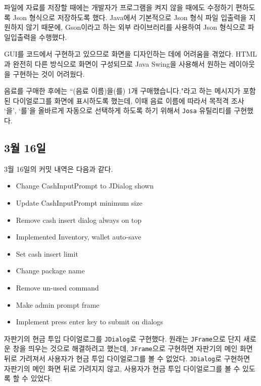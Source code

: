 \documentclass{oblivoir}
\begin{document}
    파일에 자료를 저장할 때에는 개발자가 프로그램을 켜지 않을 때에도 수정하기 편하도록 Json 형식으로 저장하도록 했다.
    Java에서 기본적으로 Json 형식 파일 입출력을 지원하지 않기 때문에, Gson이라고 하는 외부 라이브러리를 사용하여
    Json 형식으로 파일입출력을 수행했다.

    GUI를 코드에서 구현하고 있으므로 화면을 디자인하는 데에 어려움을 겪었다.
    HTML과 완전히 다른 방식으로 화면이 구성되므로 Java Swing을 사용해서 원하는 레이아웃을 구현하는 것이 어려웠다.

    음료를 구매한 후에는 ``(음료 이름)을(를) 1개 구매했습니다."라고 하는 메시지가 포함된
    다이얼로그를 화면에 표시하도록 했는데, 이때 음료 이름에 따라서 목적격 조사 `을', `를'을 올바르게 자동으로 선택하게 하도록 하기 위해서
    \texttt{Josa} 유틸리티를 구현했다.

    \subsection{3월 16일}

    3월 16일의 커밋 내역은 다음과 같다.
    \begin{itemize}
        \item Change CashInputPrompt to JDialog shown
        \item Update CashInputPrompt minimum size
        \item Remove cash insert dialog always on top
        \item Implemented Inventory, wallet auto-save
        \item Set cash insert limit
        \item Change package name
        \item Remove un-used command
        \item Make admin prompt frame
        \item Implement press enter key to submit on dialogs
    \end{itemize}

    자판기의 현금 투입 다이얼로그를 \texttt{JDialog}로 구현했다.
    원래는 \texttt{JFrame}으로 단지 새로운 창을 띄우는 것으로 해결하려고 했는데,
    \texttt{JFrame}으로 구현하면 자판기의 메인 화면 뒤로 가려져서 사용자가 현금 투입 다이얼로그를 볼 수 없었다.
    \texttt{JDialog}로 구현하면 자판기의 메인 화면 뒤로 가려지지 않고, 사용자가 현금 투입 다이얼로그를 볼 수 있도록 할 수 있었다.
\end{document}
